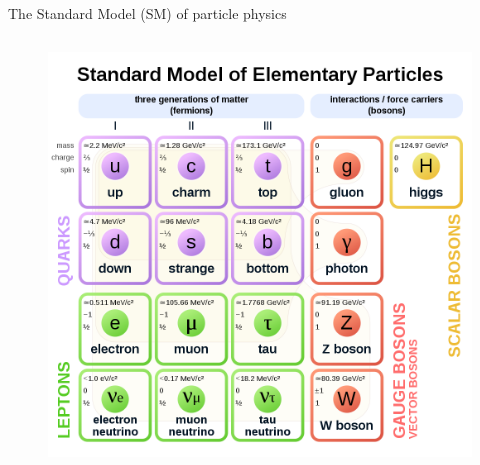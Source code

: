 \begin{frame}{The Standard Model (SM) of particle physics}
\begin{columns}
\begin{figure}
    \centering
    \includegraphics[width=1\textwidth]{Part1/Img/SM_particles.png}
\end{figure}
\end{columns}
\end{frame}

